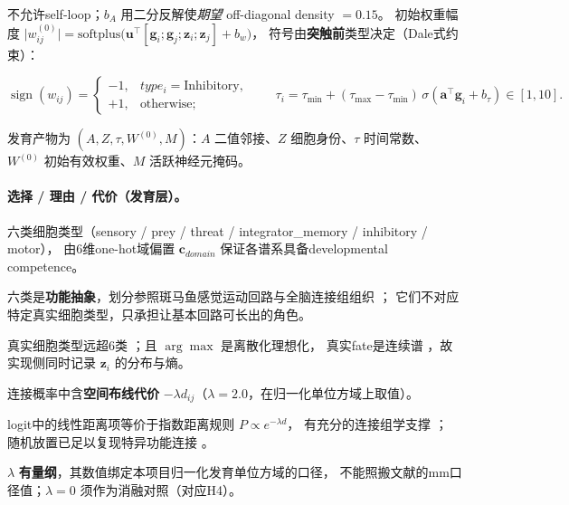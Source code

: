 不允许self-loop；$b_A$ 用二分反解使\emph{期望} off-diagonal density $=0.15$。
初始权重幅度 $\lvert w^{(0)}_{ij}\rvert=\mathrm{softplus}\bigl(\mathbf u^\top[\mathbf g_i;\mathbf g_j;\mathbf z_i;\mathbf z_j]+b_w\bigr)$，
符号由\textbf{突触前}类型决定（Dale式约束）：

\begin{equation}\label{method:eq-dale}
\operatorname{sign}(w_{ij})=
\begin{cases}
-1, & type_i=\text{Inhibitory},\\
+1, & \text{otherwise};
\end{cases}
\qquad
\tau_i=\tau_{\min}+(\tau_{\max}-\tau_{\min})\,\sigma(\mathbf a^\top\mathbf g_i+b_\tau)\in[1,10].
\end{equation}

发育产物为 $(A,Z,\tau,W^{(0)},M)$：$A$ 二值邻接、$Z$ 细胞身份、$\tau$ 时间常数、
$W^{(0)}$ 初始有效权重、$M$ 活跃神经元掩码。

\paragraph{选择 / 理由 / 代价（发育层）。}

\begin{description}
  \item 六类细胞类型（sensory / prey / threat / integrator\_memory / inhibitory / motor），
        由6维one-hot域偏置 $\mathbf c_{domain}$ 保证各谱系具备developmental competence。
  \item 六类是\textbf{功能抽象}，划分参照斑马鱼感觉运动回路与全脑连接组组织
        \citep{bib6_petrucco2023,bib7_dunn2016,bib14_dorkenwald2024}；
        它们不对应特定真实细胞类型，只承担让基本回路可长出的角色。
  \item[代价] 真实细胞类型远超6类 \citep{bib84_kunst2019}；且 $\arg\max$ 是离散化理想化，
        真实fate是连续谱 \citep{bib75_moris2016}，故实现侧同时记录 $\mathbf z_i$ 的分布与熵。
\end{description}

\begin{description}
  \item 连接概率中含\textbf{空间布线代价} $-\lambda d_{ij}$（$\lambda=2.0$，在归一化单位方域上取值）。
  \item logit中的线性距离项等价于指数距离规则 $P\propto e^{-\lambda d}$，
        有充分的连接组学支撑 \citep{bib125_ercseyravasz2013}；
        随机放置已足以复现特异功能连接 \citep{bib123_hill2012}。
  \item[代价] $\lambda$ \textbf{有量纲}，其数值绑定本项目归一化发育单位方域的口径，
        不能照搬文献的mm口径值；$\lambda=0$ 须作为消融对照（对应H4）。
\end{description}

